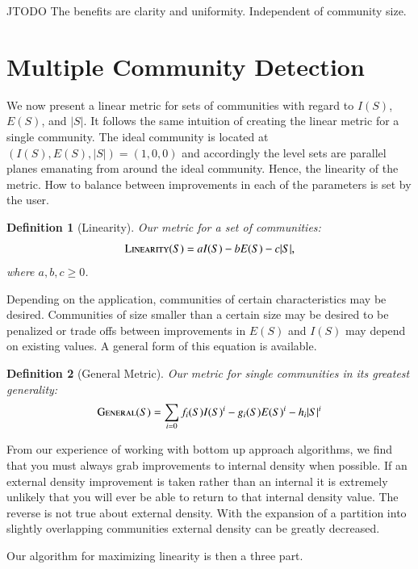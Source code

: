 \documentclass[phd,tocprelim]{cornell}
\newtheorem{definition}{Definition}
\begin{document}
JTODO The benefits are clarity and uniformity.  Independent of community size.


\section{Multiple Community Detection}

We now present a linear metric for sets of communities with regard to $I(S)$, $E(S)$, and $|S|$.  It follows the same intuition of creating the linear metric for a single community.  The ideal community is located at $(I(S), E(S), |S|) = (1, 0, 0)$ and accordingly the level sets are parallel planes emanating from around the ideal community.  Hence, the linearity of the metric.  How to balance between improvements in each of the parameters is set by the user.
\begin{definition}[Linearity]
 Our metric for a set of communities:
  \begin{equation}
   \mbox{\sc Linearity}(S) = a I(S) - b E(S) - c |S|,
  \end{equation}
where $a,b,c \geq 0$.
\end{definition}
Depending on the application, communities of certain characteristics may be desired.  Communities of size smaller than a certain size may be desired to be penalized or trade offs between improvements in $E(S)$ and $I(S)$ may depend on existing values.  A general form of this equation is available.
\begin{definition}[General Metric]
 Our metric for single communities in its greatest generality:
  \begin{equation}
   \mbox{\sc General} (S) = \sum\limits_{i = 0} f_i(S) I(S)^i - g_i(S) E(S)^i - h_i |S|^i
  \end{equation}
\end{definition}

From our experience of working with bottom up approach algorithms, we find that you must always grab improvements to internal density when possible.  If an external density improvement is taken rather than an internal it is extremely unlikely that you will ever be able to return to that internal density value.  The reverse is not true about external density.  With the expansion of a partition into slightly overlapping communities external density can be greatly decreased.

Our algorithm for maximizing linearity is then a three part.
\end{document}
